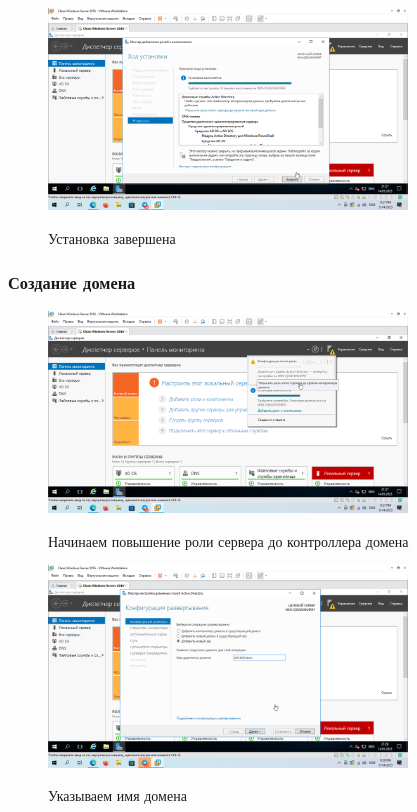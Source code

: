 \documentclass[a4paper]{article}
\begin{document}
  \begin{figure}[H]
    \centering
    \includegraphics[width=0.85\textwidth]{5_0040}
    \label{img:40}
    \caption{Установка завершена}
  \end{figure}

  \subsubsection{Создание домена}

  \begin{figure}[H]
    \centering
    \includegraphics[width=0.85\textwidth]{5_0041}
    \label{img:41}
    \caption{Начинаем повышение роли сервера до контроллера домена}
  \end{figure}

  \begin{figure}[H]
    \centering
    \includegraphics[width=0.85\textwidth]{5_0045}
    \label{img:45}
    \caption{Указываем имя домена}
  \end{figure}
\end{document}
